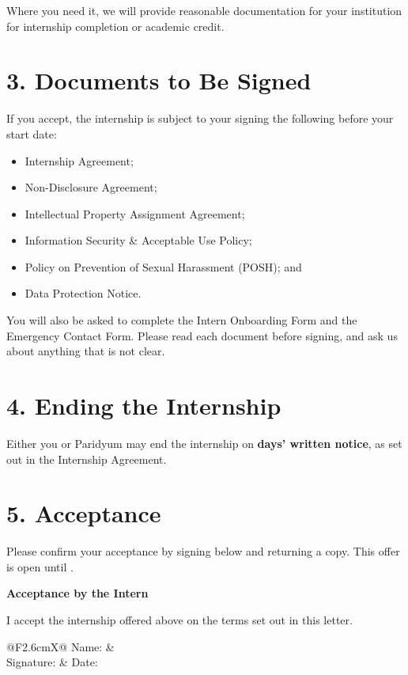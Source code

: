 \documentclass{paridyum}
\begin{document}
Where you need it, we will provide reasonable documentation for your institution for
internship completion or academic credit.

\section*{3. Documents to Be Signed}
If you accept, the internship is subject to your signing the following before your
start date:
\begin{itemize}[leftmargin=*, noitemsep]
    \item Internship Agreement;
    \item Non-Disclosure Agreement;
    \item Intellectual Property Assignment Agreement;
    \item Information Security \& Acceptable Use Policy;
    \item Policy on Prevention of Sexual Harassment (POSH); and
    \item Data Protection Notice.
\end{itemize}
You will also be asked to complete the Intern Onboarding Form and the Emergency
Contact Form. Please read each document before signing, and ask us about anything that
is not clear.

\section*{4. Ending the Internship}
Either you or Paridyum may end the internship on
\textbf{\dkOrgNoticePeriodDays{} days' written notice}, as set out in the Internship
Agreement.

\section*{5. Acceptance}
Please confirm your acceptance by signing below and returning a copy. This offer is
open until \dkblank[3.5cm].

\vspace{1.2em}
\paridyumofficers{\dkSigCeoName}{\dkSigCeoDesignation}{\dkSigCtoName}{\dkSigCtoDesignation}

\vspace{1.2em}
\begin{softbox}
\textbf{Acceptance by the Intern}

\vspace{0.5em}
I accept the internship offered above on the terms set out in this letter.

\vspace{1em}
\begin{tabularx}{\linewidth}{@{}F{2.6cm}X@{}}
Name:      & \dkPIdentityLegalName \\[1em]
Signature: & \dkblank[5.5cm] \quad Date: \dkblank[3.5cm]
\end{tabularx}
\end{softbox}
\end{document}
